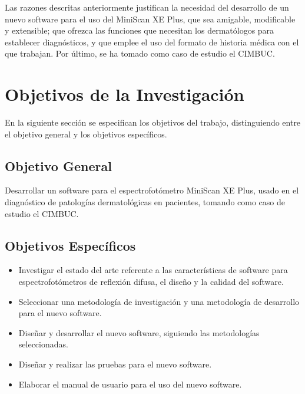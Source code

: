 Las razones descritas anteriormente justifican la necesidad del desarrollo de un nuevo software para el uso del MiniScan XE Plus, que sea amigable, modificable y extensible; que ofrezca las funciones que necesitan los dermat\'{o}logos para establecer diagn\'{o}sticos, y que emplee el uso del formato de historia m\'{e}dica con el que trabajan. Por \'{u}ltimo, se ha tomado como caso de estudio el CIMBUC.

	\newpage

	\section{Objetivos de la Investigaci\'{o}n}
En la siguiente secci\'{o}n se especifican los objetivos del trabajo, distinguiendo entre el objetivo general y los objetivos espec\'{i}ficos.
		\subsection{Objetivo General}
	Desarrollar un software para el espectrofot\'{o}metro MiniScan XE Plus, usado en el diagn\'{o}stico de patolog\'{i}as dermatol\'{o}gicas en pacientes, tomando como caso de estudio el CIMBUC.
		\subsection{Objetivos Espec\'{i}ficos}
			\begin{itemize}
				\item Investigar el estado del arte referente a las caracter\'{i}sticas de software para espectrofot\'{o}metros de reflexi\'{o}n difusa, el dise\~{n}o y la calidad del software.
				\item Seleccionar una metodolog\'{i}a de investigaci\'{o}n y una metodolog\'{i}a de desarrollo para el nuevo software.
				\item Dise\~{n}ar  y desarrollar el nuevo software, siguiendo las metodolog\'{i}as \mbox{seleccionadas}.
				\item Dise\~{n}ar y realizar las pruebas para el nuevo software.
				\item Elaborar el manual de usuario para el uso del nuevo software.
			\end{itemize}